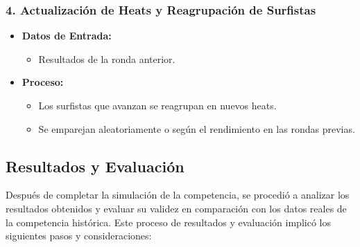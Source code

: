 \documentclass[12pt]{article}
\begin{document}
\subsubsection*{4. Actualización de Heats y Reagrupación de Surfistas}

\begin{itemize}
    \item \textbf{Datos de Entrada:}
        \begin{itemize}
            \item Resultados de la ronda anterior.
        \end{itemize}
    \item \textbf{Proceso:}
        \begin{itemize}
            \item Los surfistas que avanzan se reagrupan en nuevos heats.
            \item Se emparejan aleatoriamente o según el rendimiento en las rondas previas.
        \end{itemize}
\end{itemize}

\subsection*{Resultados y Evaluación}

Después de completar la simulación de la competencia, se procedió a analizar los resultados obtenidos y evaluar su validez en comparación con los datos reales de la competencia histórica. Este proceso de resultados y evaluación implicó los siguientes pasos y consideraciones:
\end{document}

